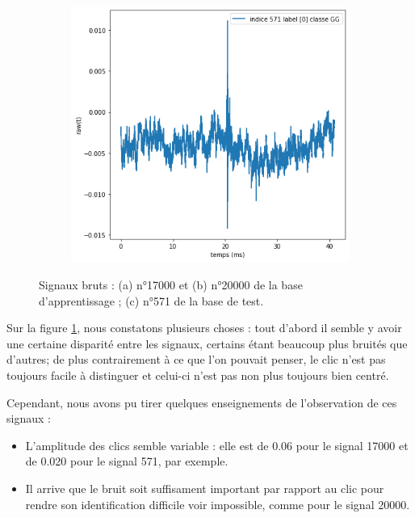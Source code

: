 \begin{figure}[!h]
\begin{subfigure}[b]{0.3\textwidth}
	\caption{}
  	\end{subfigure}
  	\begin{subfigure}[b]{0.3\textwidth}
    \includegraphics[width=\textwidth]{./images/indice571Spectro1Dlabel9classeZCsansprocessingsanszoom.png}
    	\caption{}
	\end{subfigure}
\caption{Signaux bruts : (a) n°17000 et (b) n°20000 de la base d'apprentissage ; (c) n°571 de la base de test.%
\label{fig:signauxbruts}}
\end{figure}

Sur la figure \ref{fig:signauxbruts}, nous constatons plusieurs choses : tout d'abord il semble y avoir une certaine disparité entre les signaux, certains étant beaucoup plus bruités que d'autres; de plus contrairement à ce que l'on pouvait penser, le clic n'est pas toujours facile à distinguer et celui-ci n'est pas non plus toujours bien centré.

Cependant, nous avons pu tirer quelques enseignements de l'observation de ces signaux :
\begin{itemize}
\item L'amplitude des clics semble variable : elle est de 0.06 pour le signal 17000 et de 0.020 pour le signal 571, par exemple.
\item Il arrive que le bruit soit suffisament important par rapport au clic pour rendre son identification difficile voir impossible, comme pour le signal 20000.
\end{itemize}

